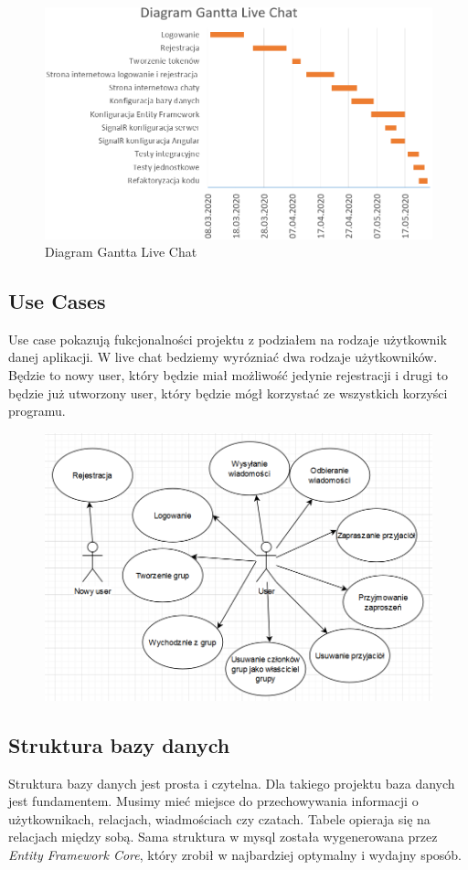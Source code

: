 \documentclass[12pt,a4paper]{article}
\begin{document}
\begin{figure}[H]
	\centering
	\includegraphics[width=0.8\linewidth]{diagramGantta}
	\caption{Diagram Gantta Live Chat}
	\label{fig:diagramgantta}
\end{figure}

\subsection{Use Cases}					%
\hspace*{0.7cm} Use case pokazują fukcjonalności projektu z podziałem na rodzaje użytkownik danej aplikacji. W live chat bedziemy wyrózniać dwa rodzaje użytkowników. Będzie to nowy user, który będzie miał możliwość jedynie rejestracji i drugi to będzie już utworzony user, który będzie mógł korzystać ze wszystkich korzyści programu.

\begin{figure}[H]
	\centering
	\includegraphics[width=0.7\linewidth]{usecase}
	\caption{}
	\label{fig:usecase}
\end{figure}

\subsection{Struktura bazy danych}  	%
\hspace*{0.7cm} Struktura bazy danych jest prosta i czytelna. Dla takiego projektu baza danych jest fundamentem. Musimy mieć miejsce do przechowywania informacji o użytkownikach, relacjach, wiadmościach czy czatach. Tabele opieraja się na relacjach między sobą. Sama struktura w mysql została wygenerowana przez \textit{Entity Framework Core}, który zrobił w najbardziej optymalny i wydajny sposób.
\end{document}
